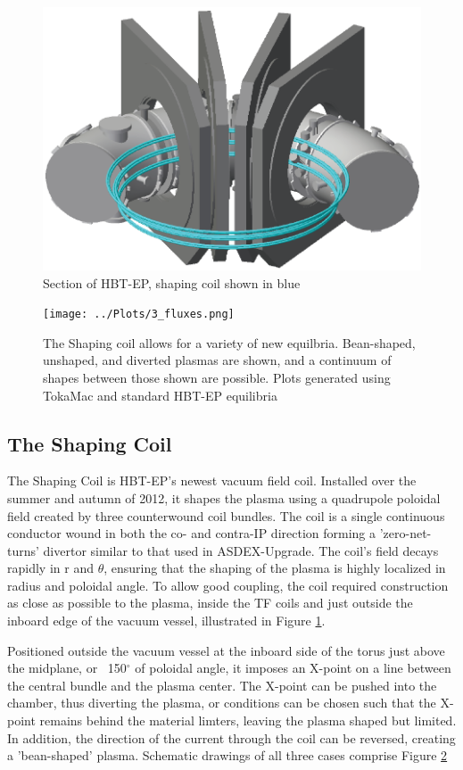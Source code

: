 \documentclass[aps,prl,twocolumn,superscriptaddress,groupedaddress]{revtex4}  %
\begin{document}
\begin{figure}[htb]
	\centering
\includegraphics[scale=.35]{../Plots/HBT_section_cropped.png}\caption{Section of HBT-EP, shaping coil shown in blue}
	\label{Coil_HBT_Section}
	\end{figure}
	
\begin{figure}[htb]
	\centering
\texttt{[image: ../Plots/3\_fluxes.png]}
	\caption{The Shaping coil allows for a variety of new equilbria.  Bean-shaped, unshaped, and diverted plasmas are shown, and a continuum of shapes between those shown are possible.  Plots generated using TokaMac and standard HBT-EP equilibria}
	\label{3_shapes}
	\end{figure}	

\subsection{The Shaping Coil}
    The Shaping Coil is HBT-EP's newest vacuum field coil.  Installed over the summer and autumn of 2012, it shapes the plasma using a quadrupole poloidal field created by three counterwound coil bundles.  The coil is a single continuous conductor wound in both the co- and contra-IP direction forming a 'zero-net-turns' divertor similar to that used in ASDEX-Upgrade\cite{Keilhacker}.  The coil's field decays rapidly in r and $\theta$, ensuring that the shaping of the plasma is highly localized in radius and poloidal angle.  To allow good coupling, the coil required construction as close as possible to the plasma, inside the TF coils and just outside the inboard edge of the vacuum vessel, illustrated in Figure \ref{Coil_HBT_Section}.\par
    Positioned outside the vacuum vessel at the inboard side of the torus just above the midplane, or ~150$^{\circ}$ of poloidal angle, it imposes an X-point on a line between the central bundle and the plasma center.  The X-point can be pushed into the chamber, thus diverting the plasma, or conditions can be chosen such that the X-point remains behind the material limters, leaving the plasma shaped but limited.  In addition, the direction of the current through the coil can be reversed, creating a 'bean-shaped' plasma.  Schematic drawings of all three cases comprise Figure \ref{3_shapes}\par
    
\end{document}
